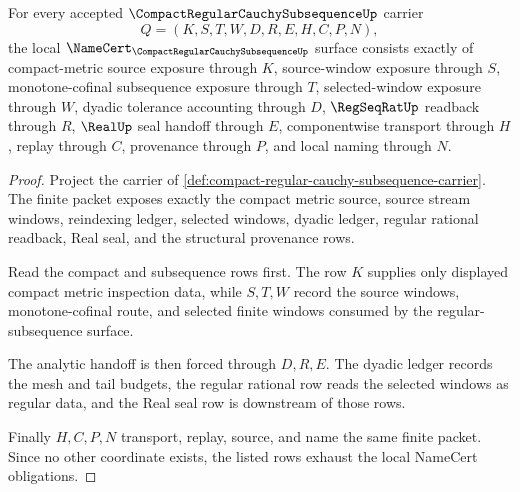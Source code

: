 \begin{theorem}
\label{thm:compact-regular-cauchy-subsequence-namecert-obligations}
For every accepted $\CompactRegularCauchySubsequenceUp$ carrier
$$
Q=(K,S,T,W,D,R,E,H,C,P,N),
$$
the local $\NameCert_{\CompactRegularCauchySubsequenceUp}$ surface consists exactly of compact-metric source exposure through $K$, source-window exposure through $S$, monotone-cofinal subsequence exposure through $T$, selected-window exposure through $W$, dyadic tolerance accounting through $D$, $\RegSeqRatUp$ readback through $R$, $\RealUp$ seal handoff through $E$, componentwise transport through $H$, replay through $C$, provenance through $P$, and local naming through $N$.
\end{theorem}
\begin{proof}
Project the carrier of \autoref{def:compact-regular-cauchy-subsequence-carrier}. The finite packet exposes exactly the compact metric source, source stream windows, reindexing ledger, selected windows, dyadic ledger, regular rational readback, Real seal, and the structural provenance rows.

Read the compact and subsequence rows first. The row $K$ supplies only displayed compact metric inspection data, while $S,T,W$ record the source windows, monotone-cofinal route, and selected finite windows consumed by the regular-subsequence surface.

The analytic handoff is then forced through $D,R,E$. The dyadic ledger records the mesh and tail budgets, the regular rational row reads the selected windows as regular data, and the Real seal row is downstream of those rows.

Finally $H,C,P,N$ transport, replay, source, and name the same finite packet. Since no other coordinate exists, the listed rows exhaust the local NameCert obligations.
\end{proof}

